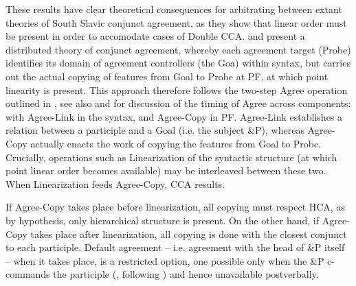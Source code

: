 \documentclass[output=paper
,modfonts
,nonflat]{langsci/langscibook}
\begin{document}
\begin{exe} 
\ex
\begin{xlist}
\end{xlist}
\end{exe}
These results have clear theoretical consequences for arbitrating between extant theories of South Slavic conjunct agreement, as they show that linear order must be present in order to accomodate cases of Double CCA. \cite{marusicnevinsbadecker:15} and \cite{willergold:16} present a distributed theory of conjunct agreement, whereby each agreement target (Probe) identifies its domain of agreement controllers (the Goa) within syntax, but carries out the actual copying of features from Goal to Probe at PF, at which point linearity is present. This approach therefore follows the two-step Agree operation outlined in  \citet{arregi-nevins:12}, see also  and  for discussion of the timing of Agree across components: with Agree-Link in the syntax, and Agree-Copy in PF. Agree-Link establishes a relation between a participle and a Goal (i.e. the subject \&P), whereas Agree-Copy actually enacts the work of copying the features from Goal to Probe. Crucially, operations such as Linearization of the syntactic structure (at which point linear order becomes available) may be interleaved between these two. When Linearization feeds Agree-Copy, CCA results. 

If Agree-Copy takes place before linearization, all copying must respect HCA, as by hypothesis, only hierarchical structure is present. On the other hand, if Agree-Copy takes place after linearization, all copying is done with the closest conjunct to each participle. Default agreement -- i.e. agreement with the head of \&P itself --  when it takes place, is a restricted option, one possible only when the \&P c-commands the participle (\citealt{willergold:16}, following \citealt{smith:17a}) and hence unavailable postverbally.
\end{document}
